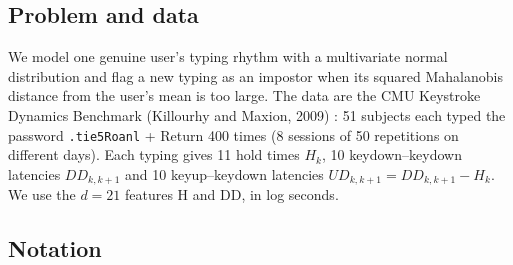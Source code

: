 \documentclass[11pt]{article}
\theoremstyle{definition}
\begin{document}
\subsection{Problem and data}
We model one genuine user's typing rhythm with a multivariate normal distribution and flag a new typing as an impostor when its squared Mahalanobis distance from the user's mean is too large. The data are the CMU Keystroke Dynamics Benchmark (Killourhy and Maxion, 2009) \cite{km09}: 51 subjects each typed the password \texttt{.tie5Roanl} + Return 400 times (8 sessions of 50 repetitions on different days). Each typing gives 11 hold times $H_k$, 10 keydown--keydown latencies $DD_{k,k+1}$ and 10 keyup--keydown latencies $UD_{k,k+1}=DD_{k,k+1}-H_k$. We use the $d=21$ features H and DD, in log seconds.

\subsection{Notation}
\end{document}
